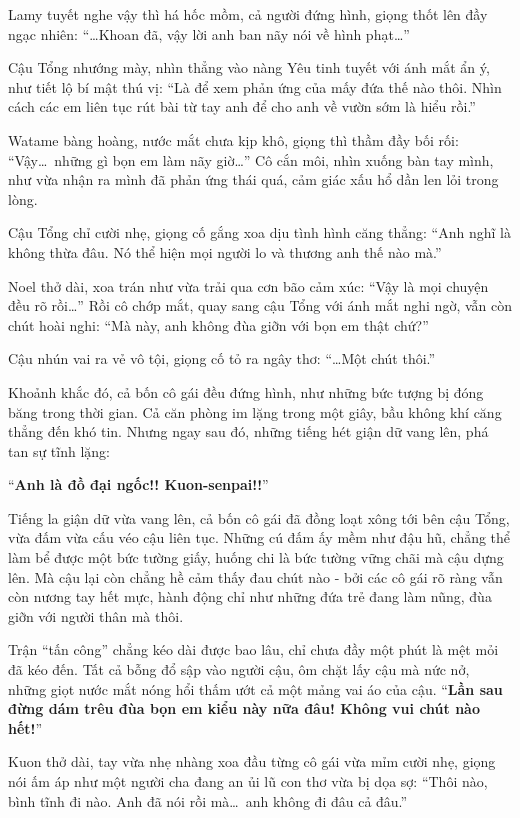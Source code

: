 \documentclass[../main.tex]{subfiles}
\begin{document}
Lamy tuyết nghe vậy thì há hốc mồm, cả người đứng hình, giọng thốt lên đầy ngạc nhiên: ``\dots Khoan đã, vậy lời anh ban nãy nói về hình phạt\dots''

Cậu Tổng nhướng mày, nhìn thẳng vào nàng Yêu tinh tuyết với ánh mắt ẩn ý, như tiết lộ bí mật thú vị: ``Là để xem phản ứng của mấy đứa thế nào thôi. Nhìn cách các em liên tục rút bài từ tay anh để cho anh về vườn sớm là hiểu rồi.''

Watame bàng hoàng, nước mắt chưa kịp khô, giọng thì thầm đầy bối rối: ``Vậy\dots\ những gì bọn em làm nãy giờ\dots'' Cô cắn môi, nhìn xuống bàn tay mình, như vừa nhận ra mình đã phản ứng thái quá, cảm giác xấu hổ dần len lỏi trong lòng.

Cậu Tổng chỉ cười nhẹ, giọng cố gắng xoa dịu tình hình căng thẳng: ``Anh nghĩ là không thừa đâu. Nó thể hiện mọi người lo và thương anh thế nào mà.''

Noel thở dài, xoa trán như vừa trải qua cơn bão cảm xúc: ``Vậy là mọi chuyện đều rõ rồi\dots'' Rồi cô chớp mắt, quay sang cậu Tổng với ánh mắt nghi ngờ, vẫn còn chút hoài nghi: ``Mà này, anh không đùa giỡn với bọn em thật chứ?''

Cậu nhún vai ra vẻ vô tội, giọng cố tỏ ra ngây thơ: ``\dots Một chút thôi.''

Khoảnh khắc đó, cả bốn cô gái đều đứng hình, như những bức tượng bị đóng băng trong thời gian. Cả căn phòng im lặng trong một giây, bầu không khí căng thẳng đến khó tin. Nhưng ngay sau đó, những tiếng hét giận dữ vang lên, phá tan sự tĩnh lặng:

``\textbf{Anh là đồ đại ngốc!! Kuon-senpai!!}''

Tiếng la giận dữ vừa vang lên, cả bốn cô gái đã đồng loạt xông tới bên cậu Tổng, vừa đấm vừa cấu véo cậu liên tục. Những cú đấm ấy mềm như đậu hũ, chẳng thể làm bể được một bức tường giấy, huống chi là bức tường vững chãi mà cậu dựng lên. Mà cậu lại còn chẳng hề cảm thấy đau chút nào - bởi các cô gái rõ ràng vẫn còn nương tay hết mực, hành động chỉ như những đứa trẻ đang làm nũng, đùa giỡn với người thân mà thôi.

Trận ``tấn công'' chẳng kéo dài được bao lâu, chỉ chưa đầy một phút là mệt mỏi đã kéo đến. Tất cả bỗng đổ sập vào người cậu, ôm chặt lấy cậu mà nức nở, những giọt nước mắt nóng hổi thấm ướt cả một mảng vai áo của cậu. ``\textbf{Lần sau đừng dám trêu đùa bọn em kiểu này nữa đâu! Không vui chút nào hết!}''

Kuon thở dài, tay vừa nhẹ nhàng xoa đầu từng cô gái vừa mỉm cười nhẹ, giọng nói ấm áp như một người cha đang an ủi lũ con thơ vừa bị dọa sợ: ``Thôi nào, bình tĩnh đi nào. Anh đã nói rồi mà\dots\ anh không đi đâu cả đâu.''
\end{document}
